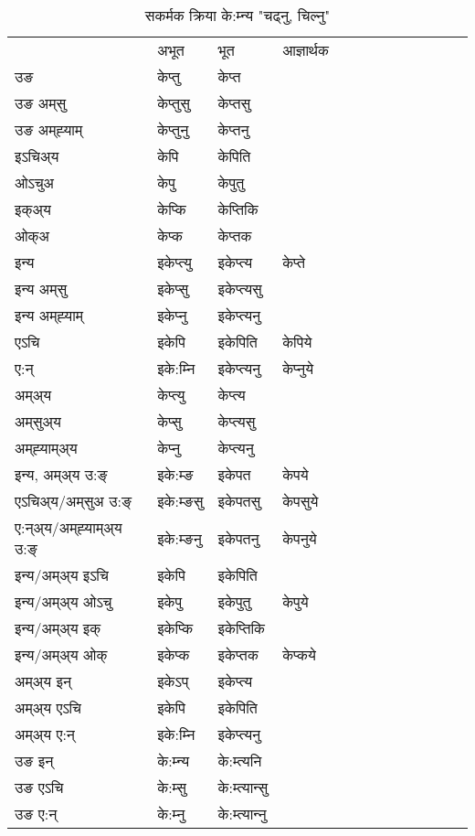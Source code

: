 \begin{table}[H]
\centering
\caption{\label{ept.vt} सकर्मक क्रिया  के:म्‍न्य  "चढ्नु, चिल्नु"  }
\begin{tabular}{l|l|l|l|l|l|l|l|l|l|l|l|l}  \toprule
&अभूत & भूत & आज्ञार्थक \\ 
उङ &केप्‍तु &केप्‍त \\ 
उङ अम्‌सु&केप्‍तुसु &केप्‍तसु \\ 
उङ अम्‌ह्‍याम्&केप्‍तुनु &केप्‍तनु \\ 
इऽचिअ्य &केपि &केपिति   \\ 
ओऽचुअ        &केपु &केपुतु   \\ 
इक्अ्य&केप्कि &केप्‍तिकि   \\ 
ओक्अ &केप्क &केप्‍तक   \\ 
इन्य & इकेप्‍त्यु  & इकेप्‍त्य &केप्‍ते  \\ 
इन्य अम्‌सु& इकेप्सु  & इकेप्‍त्यसु   \\ 
इन्य अम्‌ह्‍याम्& इकेप्‍नु  & इकेप्‍त्यनु   \\ 
एऽचि & इकेपि & इकेपिति &केपिये    \\ 
ए:न् & इके:म्‍नि  & इकेप्‍त्यनु &केप्‍नुये  \\ 
अम्अ्य & केप्‍त्यु  & केप्‍त्य  \\ 
अम्‌सुअ्य & केप्सु & केप्‍त्यसु  \\ 
अम्‌ह्‍याम्अ्य & केप्‍नु  & केप्‍त्यनु \\ 
\midrule
इन्य, अम्अ्य उ:ङ्‌ &इके:म्ङ &इकेपत &केपये \\ 
एऽचिअ्य/अम्‌सुअ उ:ङ्‌ &इके:म्ङसु &इकेपतसु &केपसुये \\ 
ए:न्अ्य/अम्‌ह्‍याम्अ्य उ:ङ्‌ &इके:म्ङनु &इकेपतनु &केपनुये \\ 
इन्य/अम्अ्य इऽचि &इकेपि &इकेपिति    \\ 
इन्य/अम्अ्य ओऽचु &इकेपु &इकेपुतु  &केपुये  \\ 
इन्य/अम्अ्य इक् &इकेप्कि &इकेप्‍तिकि   \\ 
इन्य/अम्अ्य ओक् &इकेप्क &इकेप्‍तक  &केप्कये  \\ 
अम्अ्य इन् & इकेऽप् & इकेप्‍त्य   \\ 
अम्अ्य एऽचि & इकेपि & इकेपिति    \\ 
अम्अ्य ए:न् & इके:म्‍नि  & इकेप्‍त्यनु  \\ 
\midrule
उङ इन् & के:म्‍न्य  & के:म्त्यनि  \\ 
उङ एऽचि & के:म्सु  & के:म्त्यान्सु   \\ 
उङ ए:न्& के:म्‍नु  & के:म्त्यान्‍नु   \\ 
\bottomrule
\end{tabular}
\end{table}


